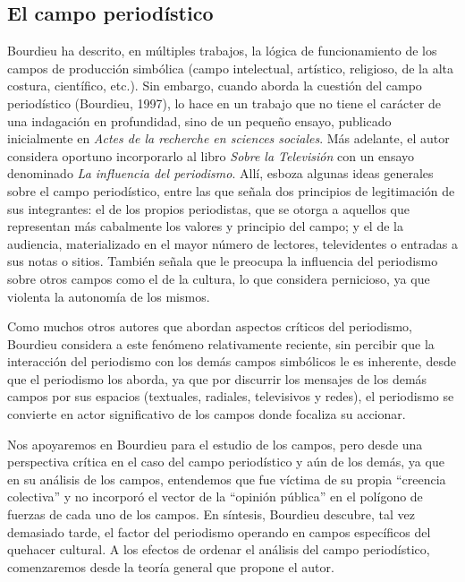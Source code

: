 \subsection {El campo periodístico}

Bourdieu ha descrito, en múltiples trabajos, la lógica de funcionamiento de los campos de producción simbólica (campo intelectual, artístico, religioso, de la alta costura, científico, etc.). Sin embargo, cuando  aborda la cuestión del campo periodístico (Bourdieu, 1997), lo hace en un trabajo que no tiene el carácter de una indagación en profundidad, sino de un pequeño ensayo, publicado inicialmente en \emph{Actes de la recherche en sciences sociales}. Más adelante, el autor considera oportuno incorporarlo al libro \emph{Sobre la Televisión} con un ensayo denominado \emph{La influencia del periodismo}. Allí, esboza algunas ideas generales sobre el campo periodístico, entre las que señala dos principios de legitimación de sus integrantes: el de los propios periodistas, que se otorga a aquellos que representan más cabalmente los valores y principio del campo; y el de la audiencia, materializado en el mayor número de lectores, televidentes o entradas a sus notas o sitios. También señala que le preocupa la influencia del periodismo sobre otros campos como el de la cultura, lo que considera pernicioso, ya que violenta la autonomía de los mismos.

Como muchos otros autores que abordan aspectos críticos del periodismo, Bourdieu considera a este fenómeno relativamente reciente, sin percibir que la interacción del periodismo con los demás campos simbólicos le es inherente, desde que el periodismo los aborda, ya que por discurrir los mensajes de los demás campos por sus espacios (textuales, radiales, televisivos y redes), el periodismo se convierte en actor significativo de los campos donde focaliza su accionar.

Nos apoyaremos en Bourdieu para el estudio de los campos, pero desde una perspectiva crítica en el caso del campo periodístico y aún de los demás, ya que en su análisis de los campos, entendemos que fue víctima de su propia ``creencia colectiva'' y no incorporó el vector de la ``opinión pública'' en el polígono de fuerzas de cada uno de los campos. En síntesis, Bourdieu descubre, tal vez demasiado tarde, el factor del periodismo operando en campos específicos del quehacer cultural. A los efectos de ordenar el análisis del campo periodístico, comenzaremos desde la teoría general que propone el autor.

